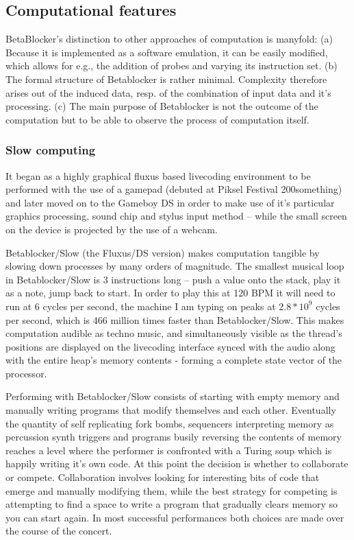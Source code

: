 \documentclass[letterpaper, 12pt]{article}
\begin{document}
\subsection{Computational features} 
\label{sub:computational_features}

BetaBlocker's distinction to other approaches of computation is manyfold:
(a) Because it is implemented as a software emulation, it can be easily modified, which allows for e.g., the addition of probes and varying its instruction set.
(b) The formal structure of Betablocker is rather minimal. Complexity therefore arises out of the induced data, resp. of the combination of input data and it's processing.
(c) The main purpose of Betablocker is not the outcome of the computation but to be able to observe the process of computation itself. 



\subsubsection{Slow computing} 
\label{sub:slow_computing}
It began as a highly graphical fluxus based livecoding environment to be performed with the use of a gamepad (debuted at Piksel Festival 200something) and later moved on to the Gameboy DS in order to make use of it's particular graphics processing, sound chip and stylus input method -- while the small screen on the device is projected by the use of a webcam.


Betablocker/Slow (the Fluxus/DS version) makes computation tangible by slowing down processes by many orders of magnitude. 
The smallest musical loop in Betablocker/Slow is 3 instructions long -- push a value onto the stack, play it as a note, jump back to start. 
In order to play this at 120 BPM it will need to run at 6 cycles per second, the machine I am typing on peaks at $2.8*10^9$ cycles per second, which is 466 million times faster than Betablocker/Slow. This makes computation audible as techno music, and simultaneously visible as the thread's positions are displayed on the livecoding interface synced with the audio along with the entire heap's memory contents - forming a complete state vector of the processor.

Performing with Betablocker/Slow consists of starting with empty memory and manually writing programs that modify themselves and each other.
Eventually the quantity of self replicating fork bombs, sequencers interpreting memory as percussion synth triggers and programs busily reversing the contents of memory reaches a level where the performer is confronted with a Turing soup which is happily writing it's own code. 
At this point the decision is whether to collaborate or compete.
Collaboration involves looking for interesting bits of code that emerge and manually modifying them, while the best strategy for competing is attempting to find a space to write a program that gradually clears memory so you can start again. 
In most successful performances both choices are made over the course of the concert.
\end{document}
